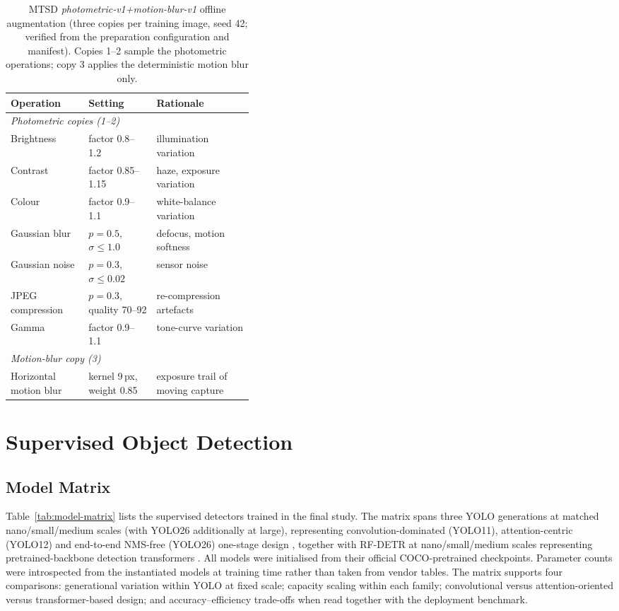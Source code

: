 \begin{table}[htbp]
\centering
\caption{MTSD \emph{photometric-v1+motion-blur-v1} offline augmentation (three copies per training image, seed 42; verified from the preparation configuration and manifest). Copies 1--2 sample the photometric operations; copy 3 applies the deterministic motion blur only.}
\label{tab:mtsd-aug}
\small
\begin{tabular}{llp{0.40\linewidth}}
\hline
\textbf{Operation} & \textbf{Setting} & \textbf{Rationale} \\
\hline
\multicolumn{3}{l}{\emph{Photometric copies (1--2)}} \\
Brightness & factor 0.8--1.2 & illumination variation \\
Contrast & factor 0.85--1.15 & haze, exposure variation \\
Colour & factor 0.9--1.1 & white-balance variation \\
Gaussian blur & $p=0.5$, $\sigma \leq 1.0$ & defocus, motion softness \\
Gaussian noise & $p=0.3$, $\sigma \leq 0.02$ & sensor noise \\
JPEG compression & $p=0.3$, quality 70--92 & re-compression artefacts \\
Gamma & factor 0.9--1.1 & tone-curve variation \\
\multicolumn{3}{l}{\emph{Motion-blur copy (3)}} \\
Horizontal motion blur & kernel 9\,px, weight 0.85 & exposure trail of moving capture \\
\hline
\end{tabular}
\end{table}

\section{Supervised Object Detection}
\label{sec:supervised-detection-methodology}

\subsection{Model Matrix}

Table~\ref{tab:model-matrix} lists the supervised detectors trained in the final study. The matrix spans three YOLO generations at matched nano/small/medium scales (with YOLO26 additionally at large), representing convolution-dominated (YOLO11), attention-centric (YOLO12) and end-to-end NMS-free (YOLO26) one-stage design \citep{ultralytics2024yolo11,tian2025yolov12,jocher2026yolo26}, together with RF-DETR at nano/small/medium scales representing pretrained-backbone detection transformers \citep{robinson2025rfdetr}. All models were initialised from their official COCO-pretrained checkpoints. Parameter counts were introspected from the instantiated models at training time rather than taken from vendor tables. The matrix supports four comparisons: generational variation within YOLO at fixed scale; capacity scaling within each family; convolutional versus attention-oriented versus transformer-based design; and accuracy--efficiency trade-offs when read together with the deployment benchmark.

